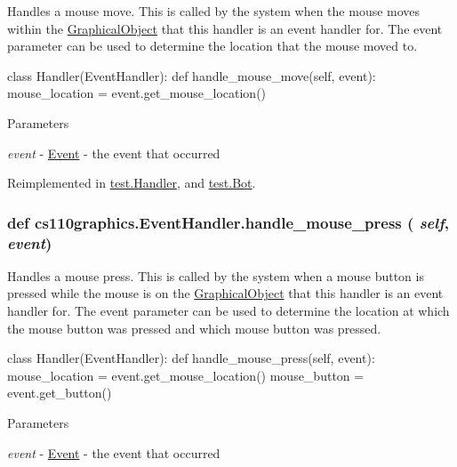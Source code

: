 Handles a mouse move. This is called by the system when the mouse moves within the \hyperlink{classcs110graphics_1_1GraphicalObject}{GraphicalObject} that this handler is an event handler for. The event parameter can be used to determine the location that the mouse moved to. 
\begin{DoxyCode}
 class Handler(EventHandler):
     def handle_mouse_move(self, event):
         mouse_location = event.get_mouse_location()
\end{DoxyCode}
 
\begin{DoxyParams}{Parameters}
\item[{\em event}]-\/ \hyperlink{classcs110graphics_1_1Event}{Event} -\/ the event that occurred \end{DoxyParams}


Reimplemented in \hyperlink{classtest_1_1Handler_a88a2d58962eb4bf7338332848fa5fc3a}{test.Handler}, and \hyperlink{classtest_1_1Bot_ad1464516fb04013fa7e353a78f0ec218}{test.Bot}.\hypertarget{classcs110graphics_1_1EventHandler_a547873123ebcd3fcc63a2e03d2a2fee3}{
\subsubsection[{handle\_\-mouse\_\-press}]{\setlength{\rightskip}{0pt plus 5cm}def cs110graphics.EventHandler.handle\_\-mouse\_\-press ( {\em self}, \/   {\em event})}}
\label{classcs110graphics_1_1EventHandler_a547873123ebcd3fcc63a2e03d2a2fee3}


Handles a mouse press. This is called by the system when a mouse button is pressed while the mouse is on the \hyperlink{classcs110graphics_1_1GraphicalObject}{GraphicalObject} that this handler is an event handler for. The event parameter can be used to determine the location at which the mouse button was pressed and which mouse button was pressed. 
\begin{DoxyCode}
 class Handler(EventHandler):
     def handle_mouse_press(self, event):
         mouse_location = event.get_mouse_location()
         mouse_button = event.get_button()
\end{DoxyCode}
 
\begin{DoxyParams}{Parameters}
\item[{\em event}]-\/ \hyperlink{classcs110graphics_1_1Event}{Event} -\/ the event that occurred \end{DoxyParams}


